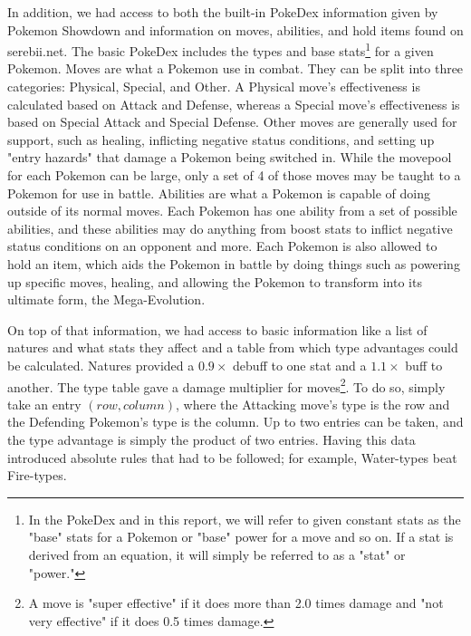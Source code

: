\documentclass{acm_proc_article-sp}
\begin{document}
In addition, we had access to both the built-in PokeDex information given by Pokemon Showdown and information on moves, abilities, and hold items found on serebii.net. The basic PokeDex includes the types and base stats\footnote{In the PokeDex and in this report, we will refer to given constant stats as the "base" stats for a Pokemon or "base" power for a move and so on. If a stat is derived from an equation, it will simply be referred to as a "stat" or "power."} for a given Pokemon. Moves are what a Pokemon use in combat. They can be split into three categories: Physical, Special, and Other. A Physical move's effectiveness is calculated based on Attack and Defense, whereas a Special move's effectiveness is based on Special Attack and Special Defense. Other moves are generally used for support, such as healing, inflicting negative status conditions, and setting up "entry hazards" that damage a Pokemon being switched in. While the movepool for each Pokemon can be large, only a set of 4 of those moves may be taught to a Pokemon for use in battle. Abilities are what a Pokemon is capable of doing outside of its normal moves. Each Pokemon has one ability from a set of possible abilities, and these abilities may do anything from boost stats to inflict negative status conditions on an opponent and more. Each Pokemon is also allowed to hold an item, which aids the Pokemon in battle by doing things such as powering up specific moves, healing, and allowing the Pokemon to transform into its ultimate form, the Mega-Evolution.

On top of that information, we had access to basic information like a list of natures and what stats they affect and a table from which type advantages could be calculated. Natures provided a $0.9\times$ debuff to one stat and a $1.1\times$ buff to another. The type table gave a damage multiplier for moves\footnote{A move is "super effective" if it does more than 2.0 times damage and "not very effective" if it does 0.5 times damage.}. To do so, simply take an entry $(row, column)$, where the Attacking move's type is the row and the Defending Pokemon's type is the column. Up to two entries can be taken, and the type advantage is simply the product of two entries. Having this data introduced absolute rules that had to be followed; for example, Water-types beat Fire-types.
\end{document}
